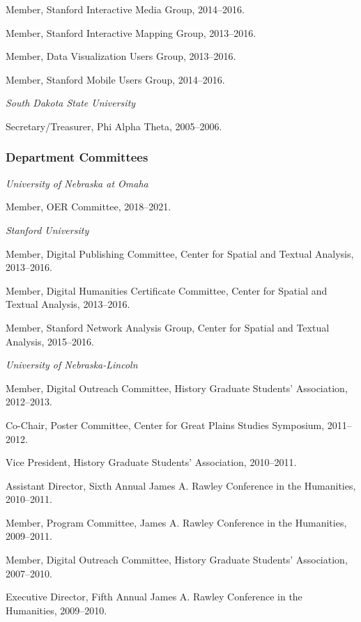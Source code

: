 Member, Stanford Interactive Media Group, 2014--2016.

Member, Stanford Interactive Mapping Group, 2013--2016.

Member, Data Visualization Users Group, 2013--2016.

Member, Stanford Mobile Users Group, 2014--2016.

\vspace{.4cm}

\emph{South Dakota State University}

Secretary/Treasurer, Phi Alpha Theta, 2005--2006.

\subsubsection{Department Committees}\label{department-committees}

\emph{University of Nebraska at Omaha}

Member, OER Committee, 2018--2021.

\vspace{.4cm}

\emph{Stanford University}

Member, Digital Publishing Committee, Center for Spatial and Textual
Analysis, 2013--2016.

Member, Digital Humanities Certificate Committee, Center for Spatial and
Textual Analysis, 2013--2016.

Member, Stanford Network Analysis Group, Center for Spatial and Textual
Analysis, 2015--2016.

\vspace{.4cm}

\emph{University of Nebraska-Lincoln}

Member, Digital Outreach Committee, History Graduate Students'
Association, 2012--2013.

Co-Chair, Poster Committee, Center for Great Plains Studies Symposium,
2011--2012.

Vice President, History Graduate Students' Association, 2010--2011.

Assistant Director, Sixth Annual James A. Rawley Conference in the
Humanities, 2010--2011.

Member, Program Committee, James A. Rawley Conference in the Humanities,
2009--2011.

Member, Digital Outreach Committee, History Graduate Students'
Association, 2007--2010.

Executive Director, Fifth Annual James A. Rawley Conference in the
Humanities, 2009--2010.

